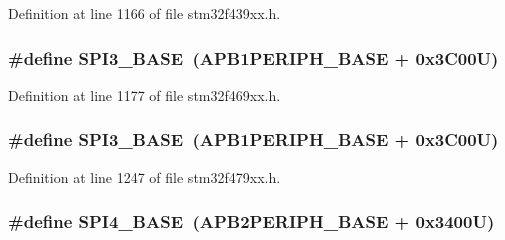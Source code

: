 Definition at line 1166 of file stm32f439xx.\+h.

\subsubsection[{\texorpdfstring{S\+P\+I3\+\_\+\+B\+A\+SE}{SPI3_BASE}}]{\setlength{\rightskip}{0pt plus 5cm}\#define S\+P\+I3\+\_\+\+B\+A\+SE~({\bf A\+P\+B1\+P\+E\+R\+I\+P\+H\+\_\+\+B\+A\+SE} + 0x3\+C00\+U)}\hypertarget{group___peripheral__memory__map_gae634fe8faa6922690e90fbec2fc86162}{}\label{group___peripheral__memory__map_gae634fe8faa6922690e90fbec2fc86162}


Definition at line 1177 of file stm32f469xx.\+h.

\subsubsection[{\texorpdfstring{S\+P\+I3\+\_\+\+B\+A\+SE}{SPI3_BASE}}]{\setlength{\rightskip}{0pt plus 5cm}\#define S\+P\+I3\+\_\+\+B\+A\+SE~({\bf A\+P\+B1\+P\+E\+R\+I\+P\+H\+\_\+\+B\+A\+SE} + 0x3\+C00\+U)}\hypertarget{group___peripheral__memory__map_gae634fe8faa6922690e90fbec2fc86162}{}\label{group___peripheral__memory__map_gae634fe8faa6922690e90fbec2fc86162}


Definition at line 1247 of file stm32f479xx.\+h.

\subsubsection[{\texorpdfstring{S\+P\+I4\+\_\+\+B\+A\+SE}{SPI4_BASE}}]{\setlength{\rightskip}{0pt plus 5cm}\#define S\+P\+I4\+\_\+\+B\+A\+SE~({\bf A\+P\+B2\+P\+E\+R\+I\+P\+H\+\_\+\+B\+A\+SE} + 0x3400\+U)}\hypertarget{group___peripheral__memory__map_gac5cfaedf263cee1e79554665f921c708}{}\label{group___peripheral__memory__map_gac5cfaedf263cee1e79554665f921c708}


